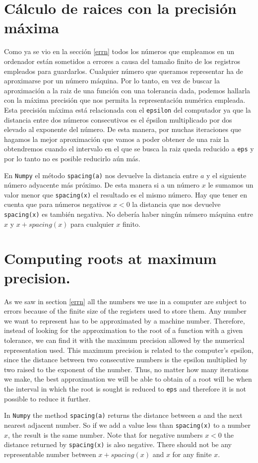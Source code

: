\begin{paracol}{2}
\section{Cálculo de raices con la precisión máxima}
Como ya se vio en la sección \ref{errn} todos los números que empleamos en un ordenador están sometidos a errores a causa del tamaño finito de los registros empleados para guardarlos. Cualquier número que queramos representar ha de aproximarse por un número máquina. Por lo tanto, en vez de buscar la aproximación a la raiz de una función con una tolerancia dada, podemos hallarla con la máxima precisión que nos permita la representación numérica empleada. Esta precisión máxima está relacionada con el \texttt{epsilon} del computador ya que la distancia entre dos números consecutivos es el épsilon multiplicado por dos elevado al exponente del número. De esta manera, por muchas iteraciones que hagamos la mejor aproximación que vamos a poder obtener de una raiz la obtendremos cuando el intervalo en el que se busca la raiz queda reducido a \texttt{eps} y por lo tanto no es posible reducirlo aún más. 

En \texttt{Numpy} el método \texttt{spacing(a)} nos devuelve la distancia entre $a$ y el siguiente número adyacente más próximo. De esta manera si a un número $x$ le sumamos un valor menor que \texttt{spacing(x)} el resultado es el mismo número. Hay que tener en cuenta que para números negativos $x<0$ la distancia que nos devuelve \texttt{spacing(x)} es también negativa. No debería haber ningún número máquina entre $x$ y $x+spacing(x)$ para cualquier $x$ finito.

\switchcolumn
\section{Computing roots at maximum precision.}
As we saw in section \ref{errn} all the numbers we use in a computer are subject to errors because of the finite size of the registers used to store them. Any number we want to represent has to be approximated by a machine number. Therefore, instead of looking for the approximation to the root of a function with a given tolerance, we can find it with the maximum precision allowed by the numerical representation used. This maximum precision is related to the computer's epsilon, since the distance between two consecutive numbers is the epsilon multiplied by two raised to the exponent of the number. Thus, no matter how many iterations we make, the best approximation we will be able to obtain of a root will be when the interval in which the root is sought is reduced to \texttt{eps} and therefore it is not possible to reduce it further. 

In \texttt{Numpy} the method \texttt{spacing(a)} returns the distance between $a$ and the next nearest adjacent number. So if we add a value less than \texttt{spacing(x)} to a number $x$, the result is the same number. Note that for negative numbers $x<0$ the distance returned by \texttt{spacing(x)} is also negative. There should not be any representable number between $x + spacing(x)$ and $x$ for any finite $x$.

\end{paracol}  


